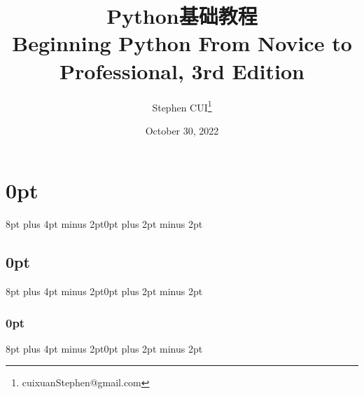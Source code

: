 \usepackage{amsmath}
\usepackage{mathptmx}
\usepackage{ctex}
\usepackage{minted}
\usepackage{tcolorbox}
\usepackage{epigraph}
\usepackage{caption}
\usepackage{graphicx}
\usepackage{listings}
\newtheorem{theorem}{Theorem}
\usepackage{tikz}
\usepackage{pifont}
\usepackage{tabularx}
\usepackage{framed}

\usepackage{titlesec}

\titlespacing\section{0pt}{8pt plus 4pt minus 2pt}{0pt plus 2pt minus 2pt}
\titlespacing\subsection{0pt}{8pt plus 4pt minus 2pt}{0pt plus 2pt minus 2pt}
\titlespacing\subsubsection{0pt}{8pt plus 4pt minus 2pt}{0pt plus 2pt minus 2pt}


\title{\textbf{Python基础教程}\\
	Beginning Python From Novice to Professional, 3rd Edition
}

\author{Stephen CUI\thanks{cuixuanStephen@gmail.com}}
\date{October 30, 2022}
\newcommand\explain[2]{
	\begin{tcolorbox}[breakable,colback=orange!5,colframe=orange!95!black,title=\textbf{#1}]
		#2
	\end{tcolorbox}
}



\newcommand\warning[1]{
	\begin{tcolorbox}[breakable, colback=orange!7, colframe=orange!70!black,title=Warnings]
		#1
	\end{tcolorbox}
}
\newcommand\tips[1]{\textcolor{green!70!black}{#1}}
\newcommand\notes[1]{\textcolor{blue!70}{#1}}
\newcommand\important[1]{\textcolor{red!90!black}{#1}}
\newcommand\figures[1]{
	\begin{figure}
		\centering
		\texttt{[image: img/codes/\#1.png]}
		\caption{#1}
		\label{#1}
	\end{figure}
}



